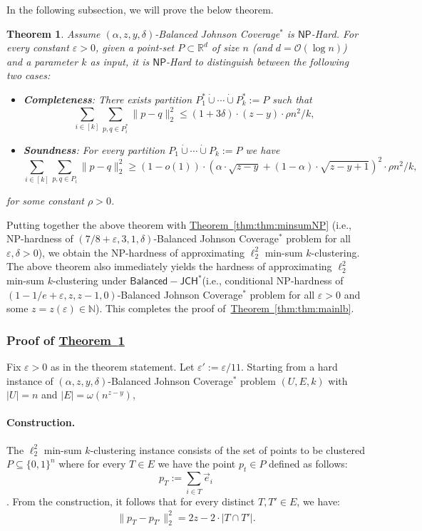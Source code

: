 \documentclass[11pt]{article}
\newtheorem{theorem}{Theorem}[section]
\newcommand{\namedref}[2]{\hyperref[#2]{#1~\ref*{#2}}}
\newcommand{\thmlab}[1]{\label{thm:#1}}
\newcommand{\thmref}[1]{\namedref{Theorem}{thm:#1}}
\renewcommand{\O}[1]{\ensuremath{\mathcal{O}\left(#1\right)}}
\newcommand{\eps}{\varepsilon}
\newcommand{\JCHD}{$\mathsf{JCH}^*$\xspace}
\newcommand{\JCHDB}{$\mathsf{Balanced-JCH}^*$\xspace}
\newcommand{\jcdb}{Balanced Johnson Coverage$^*$\xspace}
\newcommand{\NP}{$\mathsf{NP}$\xspace}
\begin{document}
In the following subsection, we will prove the below theorem. 

\begin{theorem}
\thmlab{thm:mainreduction}
Assume $(\alpha, z, y,\delta)$-\jcdb is \NP-Hard. 
For every constant $\varepsilon>0$,  given a point-set $P\subset \mathbb{R}^{d}$ of size $n$ (and $d=\O{\log n}$) and a parameter $k$ as input, it is \NP-Hard to distinguish between the following two cases:
\begin{itemize}
\item \textbf{\emph{Completeness}}:  
There exists partition $P_1^*\dot\cup\cdots \dot\cup P_k^*:=P$  such that $$\sum_{i\in [k]}\sum_{p,q\in P_i^*}\|p-q\|_2^2\le (1+3\delta)\cdot (z-y)\cdot \rho n^2/k,$$
\item \textbf{\emph{Soundness}}: For every partition $P_1\dot\cup\cdots \dot\cup P_k:=P$  we have  $$\sum_{i\in [k]}\sum_{p,q\in P_i}\|p-q\|_2^2\ge (1-o(1))\cdot \left(\alpha\cdot \sqrt{z-y}+(1-\alpha)\cdot \sqrt{z-y+1}\right)^{2} \cdot \rho n^2/k,$$
\end{itemize}
for some constant $\rho>0$.
\end{theorem}

Putting together the above theorem with \thmref{thm:minsumNP} (i.e., NP-hardness of $(7/8+\varepsilon,3,1,\delta)$-\jcdb problem for all $\varepsilon,\delta>0$), we obtain the NP-hardness of approximating $\ell_2^2$ min-sum $k$-clustering. The above theorem also immediately yields the hardness of approximating $\ell_2^2$ min-sum $k$-clustering under \JCHDB (i.e., conditional NP-hardness of $(1-1/e+\varepsilon,z,z-1,0)$-\jcdb problem for all $\varepsilon>0$ and some $z=z(\varepsilon)\in\mathbb{N}$). This completes the proof of~\thmref{thm:mainlb}.


\subsubsection{Proof of \texorpdfstring{\thmref{thm:mainreduction}}{Theorem (Main Reduction)}}
Fix $\varepsilon>0$ as in the theorem statement.  Let $\eps':=\eps/11$. Starting from a hard instance of $\left( \alpha, z, y, \delta \right)$-\jcdb problem $(U,E,k)$ with $|U| = n$ and $|E| = \omega(n^{z-y})$, %



\paragraph{Construction.} 
The $\ell_2^2$ min-sum $k$-clustering instance consists of the set of points to be clustered $P\subseteq \{0,1\}^{n}$ where for every $T\in E$ we have the point $p_t\in P$ defined as follows:
\[p_T:=\sum_{i\in T}\vec{e}_i\].
From the construction, it follows that for every distinct $T,T'\in E$, we have:
\begin{align}\label{eqsub}
 \|p_T-p_{T'}\|_2^2= 2z -2\cdot |T\cap T'|. 
\end{align} 
\end{document}
